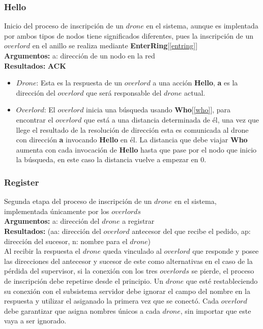 \documentclass[a4paper,10pt]{article}
\begin{document}
		\subsubsection{Hello}\label{hll}
			Inicio del proceso de inscripción de un $drone$ en el sistema, aunque es implentada por ambos tipos de nodos tiene significados diferentes, pues la inscripción de un $overlord$ en el anillo se realiza mediante \textbf{EnterRing}[\ref{entring}]
			\\
			\textbf{Argumentos:} a: dirección de un nodo en la red \\
			\textbf{Resultados:} \textbf{ACK}\\
			\begin{itemize}
				\item $Drone$: \linebreak
				Esta es la respuesta de un $overlord$ a una acción \textbf{Hello}, \textbf{a} es la dirección del $overlord$ que será responsable del $drone$ actual.
				\item $Overlord$: \linebreak
				El $overlord$ inicia una búsqueda usando \textbf{Who}[\ref{who}], para encontrar el $overlord$ que está a una distancia determinada de él, una vez que llege el resultado de la resolución de dirección esta es comunicada al drone con dirección \textbf{a} invocando \textbf{Hello} en él. La distancia que debe viajar \textbf{Who} aumenta con cada invocación de \textbf{Hello} hasta que pase por el nodo que inicio la búsqueda, en este caso la distancia vuelve a empezar en $0$.
			\end{itemize}
			
		\subsubsection{Register}\label{regt}
			Segunda etapa del proceso de inscripción de un $drone$ en el sistema, implementada únicamente por los $overlords$
			\\
			\textbf{Argumentos:} a: dirección del $drone$ a registrar\\
			\textbf{Resultados:} (aa: dirección del $overlord$ antecesor del que recibe el pedido, ap: dirección del sucesor, n: nombre para el $drone$)\\
			
			Al recibir la respuesta el $drone$ queda vinculado al $overlord$ que responde y posee las direcciones del antecesor y sucesor de este como alternativas en el caso de la pérdida del supervisor, si la conexión con los tres $overlords$ se pierde, el proceso de inscripción debe repetirse desde el principio. Un $drone$ que esté restableciendo su conexión con el subsistema servidor debe ignorar el campo del nombre en la respuesta y utilizar el asiganado la primera vez que se conectó.
			Cada $overlord$ debe garantizar que asigna nombres únicos a cada $drone$, sin importar que este vaya a ser ignorado.
			
\end{document}
